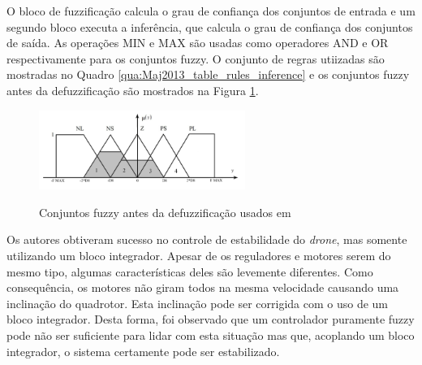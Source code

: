 O bloco de fuzzificação calcula o grau de confiança dos conjuntos de entrada e um segundo bloco executa a inferência, que calcula o grau de confiança dos conjuntos de saída. As operações MIN e MAX são usadas como operadores AND e OR respectivamente para os conjuntos fuzzy. O conjunto de regras utiizadas são mostradas no Quadro \ref{qua:Maj2013_table_rules_inference} e os conjuntos fuzzy antes da defuzzificação são mostrados na Figura \ref{fig:Maj2013_fuzzy_sets_output}.



\begin{figure}[!htb]
    \centering
    \caption{Conjuntos fuzzy antes da defuzzificação usados em \cite{Maj2013} }
    \includegraphics[width=0.6\textwidth]{./04-figuras/Maj2013_fuzzy_sets_output}
    \label{fig:Maj2013_fuzzy_sets_output}
\end{figure}

Os autores obtiveram sucesso no controle de estabilidade do \textit{drone}, mas somente utilizando um bloco integrador. Apesar de os reguladores e motores serem do mesmo tipo, algumas características deles são levemente diferentes. Como consequência, os motores não giram todos na mesma velocidade causando uma inclinação do quadrotor. Esta inclinação pode ser corrigida com o uso de um bloco integrador. Desta forma, foi observado que um controlador puramente fuzzy pode não ser suficiente para lidar com esta situação mas que, acoplando um bloco integrador, o sistema certamente pode ser estabilizado.

